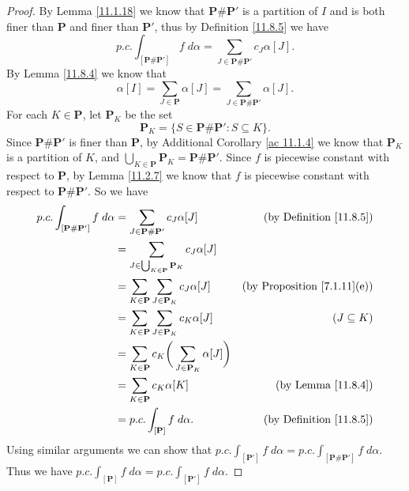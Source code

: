 \begin{proof}
    By Lemma \ref{11.1.18} we know that \(\mathbf{P} \# \mathbf{P}'\) is a partition of \(I\) and is both finer than \(\mathbf{P}\) and finer than \(\mathbf{P}'\), thus by Definition \ref{11.8.5} we have
    \[
        p.c. \int_{[\mathbf{P} \# \mathbf{P}']} f \; d \alpha = \sum_{J \in \mathbf{P} \# \mathbf{P}'} c_J \alpha[J].
    \]
    By Lemma \ref{11.8.4} we know that
    \[
        \alpha[I] = \sum_{J \in \mathbf{P}} \alpha[J] = \sum_{J \in \mathbf{P} \# \mathbf{P}'} \alpha[J].
    \]
    For each \(K \in \mathbf{P}\), let \(\mathbf{P}_K\) be the set
    \[
        \mathbf{P}_K = \{S \in \mathbf{P} \# \mathbf{P}' : S \subseteq K\}.
    \]
    Since \(\mathbf{P} \# \mathbf{P}'\) is finer than \(\mathbf{P}\), by Additional Corollary \ref{ac 11.1.4} we know that \(\mathbf{P}_K\) is a partition of \(K\), and \(\bigcup_{K \in \mathbf{P}} \mathbf{P}_K = \mathbf{P} \# \mathbf{P}'\).
    Since \(f\) is piecewise constant with respect to \(\mathbf{P}\), by Lemma \ref{11.2.7} we know that \(f\) is piecewise constant with respect to \(\mathbf{P} \# \mathbf{P}'\).
    So we have
    \begin{align*}
        p.c. \int_{[\mathbf{P} \# \mathbf{P}']} f \; d \alpha & = \sum_{J \in \mathbf{P} \# \mathbf{P}'} c_J \alpha[J]                        & \text{(by Definition \ref{11.8.5})}     \\
                                                              & = \sum_{J \in \bigcup_{K \in \mathbf{P}} \mathbf{P}_K} c_J \alpha[J]                                                    \\
                                                              & = \sum_{K \in \mathbf{P}} \sum_{J \in \mathbf{P}_K} c_J \alpha[J]             & \text{(by Proposition \ref{7.1.11}(e))} \\
                                                              & = \sum_{K \in \mathbf{P}} \sum_{J \in \mathbf{P}_K} c_K \alpha[J]             & (J \subseteq K)                         \\
                                                              & = \sum_{K \in \mathbf{P}} c_K \bigg(\sum_{J \in \mathbf{P}_K} \alpha[J]\bigg)                                           \\
                                                              & = \sum_{K \in \mathbf{P}} c_K \alpha[K]                                       & \text{(by Lemma \ref{11.8.4})}          \\
                                                              & = p.c. \int_{[\mathbf{P}]} f \; d \alpha.                                     & \text{(by Definition \ref{11.8.5})}
    \end{align*}
    Using similar arguments we can show that \(p.c. \int_{[\mathbf{P}']} f \; d \alpha = p.c. \int_{[\mathbf{P} \# \mathbf{P}']} f \; d \alpha\).
    Thus we have \(p.c. \int_{[\mathbf{P}]} f \; d \alpha = p.c. \int_{[\mathbf{P}']} f \; d \alpha\).
\end{proof}

